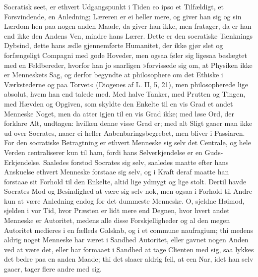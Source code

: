 \documentclass[12pt,a4paper]{article}
\begin{document}
Socratisk seet, er ethvert Udgangspunkt i Tiden eo ipso et Tilfældigt, et Forsvindende, en Anledning; Læreren er ei heller mere, og giver han sig og sin Lærdom hen paa nogen anden Maade, da giver han ikke, men fratager, da er han end ikke den Andens Ven, mindre hans Lærer. Dette er den socratiske Tænknings Dybsind, dette hans ædle gjennemførte Humanitet, der ikke gjør slet og forfængeligt Compagni med gode Hoveder, men ogsaa føler sig ligesaa beslægtet med en Feldbereder, hvorfor han jo snarligen »forvissede sig om, at Physiken ikke er Menneskets Sag, og derfor begyndte at philosophere om det Ethiske i Værkstederne og paa Torvet« (Diogenes af L. II, 5, 21), men philosopherede lige absolut, hvem han end talede med. Med halve Tanker, med Prutten og Tingen, med Hævden og Opgiven, som skyldte den Enkelte til en vis Grad et andet Menneske Noget, men da atter igjen til en vis Grad ikke; med løse Ord, der forklare Alt, undtagen: hvilken denne visse Grad er; med alt Sligt gaaer man ikke ud over Socrates, naaer ei heller Aabenbaringsbegrebet, men bliver i Passiaren. For den socratiske Betragtning er ethvert Menneske sig selv det Centrale, og hele Verden centraliserer kun til ham, fordi hans Selverkjendelse er en Guds-Erkjendelse. Saaledes forstod Socrates sig selv, saaledes maatte efter hans Anskuelse ethvert Menneske forstaae sig selv, og i Kraft deraf maatte han forstaae sit Forhold til den Enkelte, altid lige ydmygt og lige stolt. Dertil havde Socrates Mod og Besindighed at være sig selv nok, men ogsaa i Forhold til Andre kun at være Anledning endog for det dummeste Menneske. O, sjeldne Høimod, sjelden i vor Tid, hvor Præsten er lidt mere end Degnen, hvor hvert andet Menneske er Autoritet, medens alle disse Forskjelligheder og al den megen Autoritet medieres i en fælleds Galskab, og i et commune naufragium; thi medens aldrig noget Menneske har været i Sandhed Autoritet, eller gavnet nogen Anden ved at være det, eller har formaaet i Sandhed at tage Clienten med sig, saa lykkes det bedre paa en anden Maade; thi det slaaer aldrig feil, at een Nar, idet han selv gaaer, tager flere andre med sig.
\end{document}
